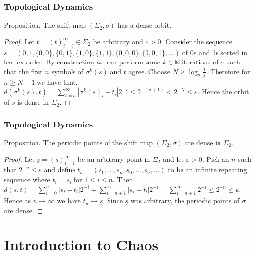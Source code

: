 \documentclass{beamer}
\begin{document}
\begin{frame}
    \frametitle{Topological Dynamics}
    \begin{block}{Proposition.}
        The shift map $(\Sigma_2, \sigma)$ has a dense orbit. \cite{devaney}
        \begin{proof}
            Let $\underline{t} = (t)_{i=0}^{\infty} \in \Sigma_2$ be arbitrary and $\varepsilon > 0$. Consider the sequence $\underline{s} = (0, 1, \{0, 0\}, \{0, 1\}, \{1, 0\}, \{1, 1\}, \{0, 0, 0\}, \{0, 0, 1\}, \dots)$ of 0s and 1s sorted in len-lex order. By construction we can perform some $k \in \mathbb{N}$ iterations of $\sigma$ such that the first $n$ symbols of $\sigma^k(\underline{s})$ and $\underline{t}$ agree. Choose $N \geq \log_2{\frac{1}{\varepsilon}}$. Therefore for $n \geq N - 1$ we have that, $d(\sigma^k(\underline{s}), \underline{t}) = \sum_{i = n}^{\infty}|\sigma^k(\underline{s})_i - t_i|2^{-i} \leq 2^{-(n+1)} < 2^{-N} \leq \varepsilon$. Hence the orbit of $\underline{s}$ is dense in $\Sigma_2$.
        \end{proof}
    \end{block}
\end{frame}

\begin{frame}
    \frametitle{Topological Dynamics}
    \begin{block}{Proposition.}
        The periodic points of the shift map $(\Sigma_2, \sigma)$ are dense in $\Sigma_2$. \cite{devaney}
    \begin{proof}
        Let $\underline{s} = (s)_{i=1}^{\infty}$ be an arbitrary point in $\Sigma_2$ and let $\varepsilon > 0$. Pick an $n$ such that $2^{-n} \leq \varepsilon$ and define $t_n = (s_0, \dots, s_n, s_0, \dots, s_n, \dots)$ to be an infinite repeating sequence where $t_i = s_i$ for $1 \leq i \leq n$. Then $d(s, t) = \sum_{i = 0}^n|s_i - t_i|2^{-i} + \sum_{i=n+1}^{\infty}|s_i - t_i|2^{-i} = \sum_{i = n+1}^{\infty}2^{-i} \leq 2^{-n} \leq \varepsilon$. Hence as $n \to \infty$ we have $t_n \to \underline{s}$. Since $\underline{s}$ was arbitrary, the periodic points of $\sigma$ are dense.
    \end{proof}
    \end{block}
\end{frame}

\section{Introduction to Chaos}
\end{document}
